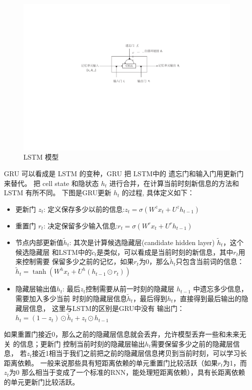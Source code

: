 \documentclass[master,openright,twoside,color]{buaathesis}
\begin{document}
\begin{figure}
  \centering
  \includegraphics[width=0.7\linewidth]{./figures/lstm.pdf}
  \caption{LSTM 模型}\label{fig:lstm}
\end{figure}


GRU 可以看成是 LSTM 的变种，GRU 把 LSTM中的 遗忘门和输入门用更新门来替代。 把 cell state 和隐状态 $h_t$ 进行合并，在计算当前时刻新信息的方法和 LSTM 有所不同。 下图是GRU更新 $h_t$ 的过程\cite{DBLP:journals/corr/Pezeshki15}, 具体定义如下：
\begin{itemize}
\item 更新门 $z_t$: 定义保存多少以前的信息:$z_t = \sigma ( W^z x_t+ U^z h_{t-1}  )$

\item 重置门 $r_t$: 决定保留多少输入信息:$r_t = \sigma(W^r x_t  + U^r h_{t-1}  )$

\item 节点内部更新值$\tilde h_t $: 其次是计算候选隐藏层(candidate hidden layer) $\tilde h_t$，这个候选隐藏层 和LSTM中的$\tilde c_t$是类似，可以看成是当前时刻的新信息，其中$r_t$用来控制需要 保留多少之前的记忆，如果$r_t$为0，那么$\tilde h_t$只包含当前词的信息：$\tilde h_t  = \tanh (W^h x_t  + U^h(h_{t-1} \odot r_t) )$

\item 隐藏层输出值$h_t$: 最后$z_t$控制需要从前一时刻的隐藏层 $h_{t-1}$ 中遗忘多少信息，需要加入多少当前 时刻的隐藏层信息$\tilde h_t$，最后得到$h_t$，直接得到最后输出的隐藏层信息， 这里与LSTM的区别是GRU中没有 输出门：$h_t = (1-z_t)\odot \tilde h_t  + z_t \odot h_{t-1}$
\end{itemize}
如果重置门接近0，那么之前的隐藏层信息就会丢弃，允许模型丢弃一些和未来无关 的信息；更新门 控制当前时刻的隐藏层输出$h_t$需要保留多少之前的隐藏层信息， 若$z_t$接近1相当于我们之前把之前的隐藏层信息拷贝到当前时刻，可以学习长距离依赖。 一般来说那些具有短距离依赖的单元重置门比较活跃（如果$r_t$为1，而$z_t$为$0$ 那么相当于变成了一个标准的RNN，能处理短距离依赖），具有长距离依赖的单元更新门比较活跃。
\end{document}
